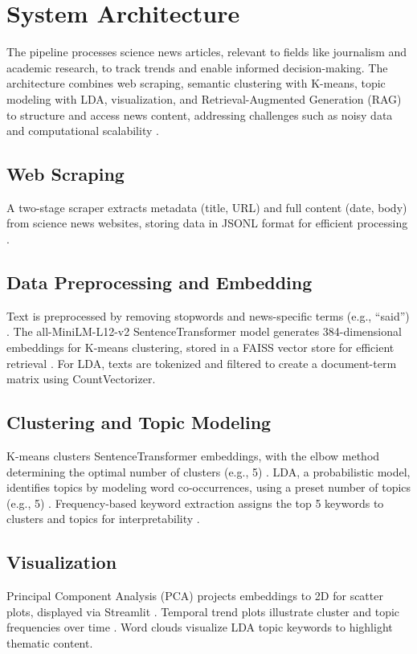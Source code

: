 \documentclass[conference]{IEEEtran}
\begin{document}
\section{System Architecture}
The pipeline processes science news articles, relevant to fields like journalism and academic research, to track trends and enable informed decision-making. The architecture combines web scraping, semantic clustering with K-means, topic modeling with LDA, visualization, and Retrieval-Augmented Generation (RAG) to structure and access news content, addressing challenges such as noisy data and computational scalability \cite{allahyari2017text}.

\subsection{Web Scraping}
A two-stage scraper extracts metadata (title, URL) and full content (date, body) from science news websites, storing data in JSONL format for efficient processing \cite{mitchell2018web}.

\subsection{Data Preprocessing and Embedding}
Text is preprocessed by removing stopwords and news-specific terms (e.g., ``said'') \cite{jurafsky2009speech}. The all-MiniLM-L12-v2 SentenceTransformer model generates 384-dimensional embeddings for K-means clustering, stored in a FAISS vector store for efficient retrieval \cite{johnson2019billion}. For LDA, texts are tokenized and filtered to create a document-term matrix using CountVectorizer.

\subsection{Clustering and Topic Modeling}
K-means clusters SentenceTransformer embeddings, with the elbow method determining the optimal number of clusters (e.g., 5) \cite{hartigan1979algorithm}. LDA, a probabilistic model, identifies topics by modeling word co-occurrences, using a preset number of topics (e.g., 5) \cite{blei2003latent}. Frequency-based keyword extraction assigns the top 5 keywords to clusters and topics for interpretability \cite{grootendorst2020keybert}.

\subsection{Visualization}
Principal Component Analysis (PCA) projects embeddings to 2D for scatter plots, displayed via Streamlit \cite{van2008visualizing,streamlit2020}. Temporal trend plots illustrate cluster and topic frequencies over time \cite{wei2010lda}. Word clouds visualize LDA topic keywords to highlight thematic content.
\end{document}
